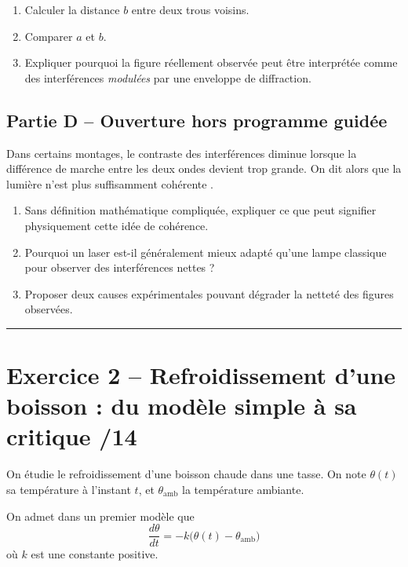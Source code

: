 \documentclass[11pt,a4paper]{article}
\begin{document}
\begin{enumerate}[label=\textbf{1.\arabic*}, resume, leftmargin=1.6em]
    \item Calculer la distance $b$ entre deux trous voisins.
    \item Comparer $a$ et $b$.
    \item Expliquer pourquoi la figure réellement observée peut être interprétée comme des interférences \emph{modulées} par une enveloppe de diffraction.
\end{enumerate}

\subsection*{Partie D -- Ouverture hors programme guidée}
Dans certains montages, le contraste des interférences diminue lorsque la différence de marche entre les deux ondes devient trop grande.  
On dit alors que la lumière n’est plus suffisamment \og cohérente \fg.

\begin{enumerate}[label=\textbf{1.\arabic*}, resume, leftmargin=1.6em]
    \item Sans définition mathématique compliquée, expliquer ce que peut signifier physiquement cette idée de cohérence.
    \item Pourquoi un laser est-il généralement mieux adapté qu’une lampe classique pour observer des interférences nettes ?
    \item Proposer deux causes expérimentales pouvant dégrader la netteté des figures observées.
\end{enumerate}

\vspace{0.5em}
\hrule
\vspace{0.6em}

\section*{Exercice 2 -- Refroidissement d’une boisson : du modèle simple à sa critique \hfill /14}

On étudie le refroidissement d’une boisson chaude dans une tasse.  
On note $\theta(t)$ sa température à l’instant $t$, et $\theta_{\mathrm{amb}}$ la température ambiante.

On admet dans un premier modèle que
\[
\frac{d\theta}{dt}=-k\big(\theta(t)-\theta_{\mathrm{amb}}\big)
\]
où $k$ est une constante positive.

\medskip
\end{document}
